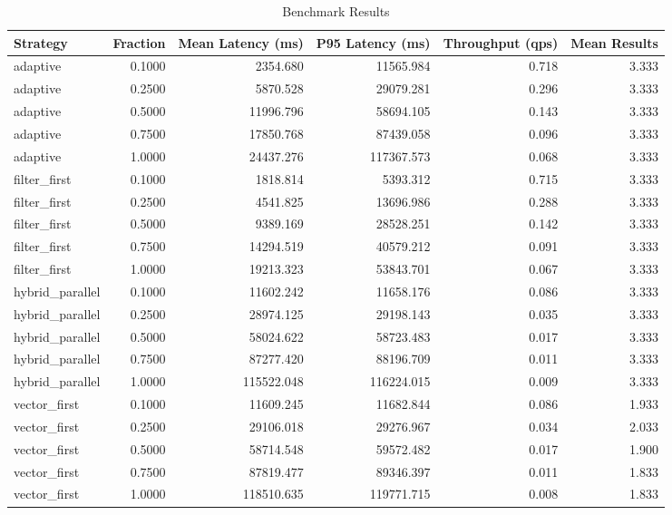 \begin{table}[ht]
\centering
\begin{tabular}{lrrrrr}
\hline
Strategy & Fraction & Mean Latency (ms) & P95 Latency (ms) & Throughput (qps) & Mean Results \\
\hline
adaptive & 0.1000 & 2354.680 & 11565.984 & 0.718 & 3.333 \\
adaptive & 0.2500 & 5870.528 & 29079.281 & 0.296 & 3.333 \\
adaptive & 0.5000 & 11996.796 & 58694.105 & 0.143 & 3.333 \\
adaptive & 0.7500 & 17850.768 & 87439.058 & 0.096 & 3.333 \\
adaptive & 1.0000 & 24437.276 & 117367.573 & 0.068 & 3.333 \\
filter_first & 0.1000 & 1818.814 & 5393.312 & 0.715 & 3.333 \\
filter_first & 0.2500 & 4541.825 & 13696.986 & 0.288 & 3.333 \\
filter_first & 0.5000 & 9389.169 & 28528.251 & 0.142 & 3.333 \\
filter_first & 0.7500 & 14294.519 & 40579.212 & 0.091 & 3.333 \\
filter_first & 1.0000 & 19213.323 & 53843.701 & 0.067 & 3.333 \\
hybrid_parallel & 0.1000 & 11602.242 & 11658.176 & 0.086 & 3.333 \\
hybrid_parallel & 0.2500 & 28974.125 & 29198.143 & 0.035 & 3.333 \\
hybrid_parallel & 0.5000 & 58024.622 & 58723.483 & 0.017 & 3.333 \\
hybrid_parallel & 0.7500 & 87277.420 & 88196.709 & 0.011 & 3.333 \\
hybrid_parallel & 1.0000 & 115522.048 & 116224.015 & 0.009 & 3.333 \\
vector_first & 0.1000 & 11609.245 & 11682.844 & 0.086 & 1.933 \\
vector_first & 0.2500 & 29106.018 & 29276.967 & 0.034 & 2.033 \\
vector_first & 0.5000 & 58714.548 & 59572.482 & 0.017 & 1.900 \\
vector_first & 0.7500 & 87819.477 & 89346.397 & 0.011 & 1.833 \\
vector_first & 1.0000 & 118510.635 & 119771.715 & 0.008 & 1.833 \\
\hline
\end{tabular}
\caption{Benchmark Results}
\end{table}